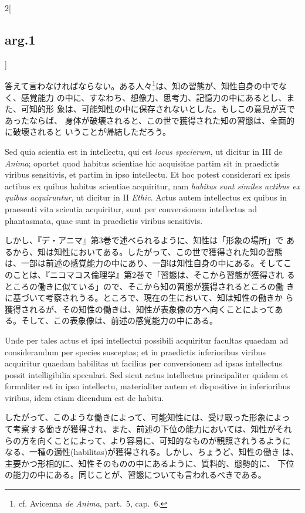 \documentclass[paper=a4paper,fontsize=10pt,jafontsize=9pt,titlepage]{jlreq}
\begin{document}
\begin{paracol}{2}[\subsection{arg.1}]
\switchcolumn

答えて言わなければならない。ある人々\footnote{cf. Avicenna {\itshape de
Anima}, part.~5, cap.~6.}は、知の習態が、知性自身の中でなく、感覚能力
の中に、すなわち、想像力、思考力、記憶力の中にあるとし、また、可知的形
象は、可能知性の中に保存されないとした。もしこの意見が真であったならば、
身体が破壊されると、この世で獲得された知の習態は、全面的に破壊されると
いうことが帰結しただろう。

\switchcolumn*

Sed quia scientia est in intellectu, qui est {\itshape locus specierum}, ut
dicitur in III de {\itshape Anima}; oportet quod habitus scientiae hic
acquisitae partim sit in praedictis viribus sensitivis, et partim in
ipso intellectu. Et hoc potest considerari ex ipsis actibus ex quibus
habitus scientiae acquiritur, nam {\itshape habitus sunt similes actibus ex
quibus acquiruntur}, ut dicitur in II {\itshape Ethic}. Actus autem
intellectus ex quibus in praesenti vita scientia acquiritur, sunt per
conversionem intellectus ad phantasmata, quae sunt in praedictis
viribus sensitivis.

\switchcolumn

しかし、『デ・アニマ』第3巻で述べられるように、知性は「形象の場所」で
あるから、知は知性においてある。したがって、この世で獲得された知の習態
は、一部は前述の感覚能力の中にあり、一部は知性自身の中にある。そしてこ
のことは、『ニコマコス倫理学』第2巻で「習態は、そこから習態が獲得され
るところの働きに似ている」ので、そこから知の習態が獲得されるところの働
きに基づいて考察されうる。ところで、現在の生において、知は知性の働きか
ら獲得されるが、その知性の働きは、知性が表象像の方へ向くことによってあ
る。そして、この表象像は、前述の感覚能力の中にある。

\switchcolumn*

Unde per tales actus et ipsi intellectui possibili acquiritur facultas
quaedam ad considerandum per species susceptas; et in praedictis
inferioribus viribus acquiritur quaedam habilitas
ut facilius per conversionem ad ipsas intellectus possit
intelligibilia speculari. Sed sicut actus intellectus principaliter
quidem et formaliter est in ipso intellectu, materialiter autem et
dispositive in inferioribus viribus, idem etiam dicendum est de
habitu.

\switchcolumn

したがって、このような働きによって、可能知性には、受け取った形象によっ
て考察する働きが獲得され、また、前述の下位の能力においては、知性がそれ
らの方を向くことによって、より容易に、可知的なものが観照されうるように
なる、一種の適性(habilitas)が獲得される。しかし、ちょうど、知性の働き
は、主要かつ形相的に、知性そのものの中にあるように、質料的、態勢的に、
下位の能力の中にある。同じことが、習態についても言われるべきである。


\end{paracol}
\end{document}

